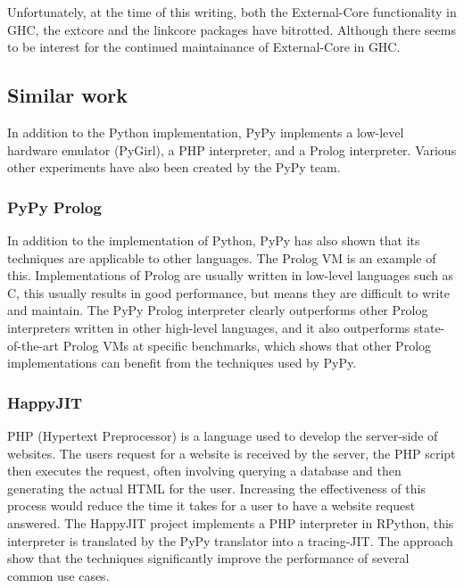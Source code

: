 Unfortunately, at the time of this writing, both the External-Core functionality in
GHC, the extcore and the linkcore 
packages have bitrotted. Although there seems to be interest for the continued 
maintainance of External-Core in GHC.

\subsection{Similar work}

In addition to the Python implementation, PyPy implements a low-level 
hardware emulator (PyGirl), a PHP interpreter, and a Prolog interpreter. 
Various other experiments have also been created by the PyPy team. 

\subsubsection{PyPy Prolog}

In addition to the implementation of Python, PyPy has also shown that its techniques
are applicable to other languages. The Prolog VM is an example of this. Implementations
of Prolog are usually written in low-level languages such as C, this usually results in
good performance, but means they are difficult to write and maintain. The PyPy Prolog 
interpreter clearly outperforms other Prolog interpreters written in other high-level
languages, and it also outperforms state-of-the-art Prolog VMs at specific benchmarks,
which shows that other Prolog implementations can benefit from the techniques used by
PyPy. \cite{bolz2010towards}

\subsubsection{HappyJIT}

PHP (Hypertext Preprocessor) is a language used to develop the server-side of 
websites. The users request for a website is received by the server, the PHP script
then executes the request, often involving querying a database and then generating 
the actual HTML for the user. Increasing the effectiveness of this process would
reduce the time it takes for a user to have a website request answered. 
The HappyJIT project implements a PHP interpreter in RPython, this interpreter is 
translated by the PyPy translator into a tracing-JIT. The approach show that 
the techniques significantly improve the performance of several common use cases.
\cite{homescu2011happyjit}

